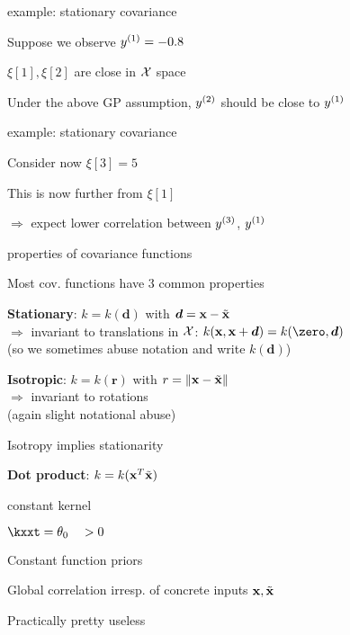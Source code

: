\documentclass[11pt,compress,t,notes=noshow, xcolor=table]{beamer}
\begin{document}
\begin{framei}{example: stationary covariance} 
\item Suppose we observe $\yi[1] = -0.8$ 
\item $\xi[1], \xi[2]$ are close in $\Xspace$ space 
\item Under the above GP assumption, $\yi[2]$ should be close to $\yi[1]$ 
\vfill 
{} 
\end{framei} 

\begin{framei}{example: stationary covariance} 
\item Consider now $\xi[3] = 5$ 
\item This is now further from $\xi[1]$
\item $\Rightarrow$ expect lower correlation between $\yi[3]$, $\yi[1]$ 
\vfill 
{} 
\end{framei}


\begin{framei}[sep=L]{properties of covariance functions}
\item Most cov. functions have 3 common properties
\item \textbf{Stationary}: $k = k(\bm{d})$ with $\bm{d} = \xv - \xtil$ \\
$\Rightarrow$ invariant to translations in $\Xspace$: $k(\xv, \xv + \bm{d}) = k(\zero, \bm{d})$\\
(so we sometimes abuse notation and write $k(\bm{d})$)
\item \textbf{Isotropic}: $k = k(\bm{r})$ with $r = \xxtnorm$ \\
$\Rightarrow$ invariant to rotations\\
(again slight notational abuse)
\item Isotropy implies stationarity
\item \textbf{Dot product}: $k = k(\xv^T \xtil)$
\end{framei}

\begin{framei}{constant kernel}
\item $\kxxt = \theta_0 \quad > 0$
\item Constant function priors
\item Global correlation irresp. of concrete inputs $\xv, \xtil$
\item Practically pretty useless
\vfill
{}
\end{framei}
\end{document}

